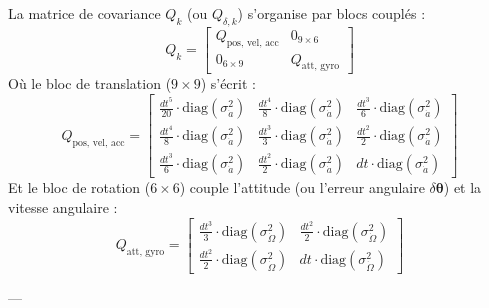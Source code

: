 \documentclass[../Formulations_Kalman.tex]{subfiles}
\begin{document}
La matrice de covariance $Q_k$ (ou $Q_{\delta, k}$) s'organise par blocs couplés :
\begin{equation}
Q_k = \begin{bmatrix}
Q_{\text{pos, vel, acc}} & 0_{9\times6} \\
0_{6\times9} & Q_{\text{att, gyro}}
\end{bmatrix}
\end{equation}
Où le bloc de translation ($9 \times 9$) s'écrit :
\begin{equation}
Q_{\text{pos, vel, acc}} = \begin{bmatrix}
\frac{dt^5}{20} \cdot \text{diag}(\sigma_{\dot{a}}^2) & \frac{dt^4}{8} \cdot \text{diag}(\sigma_{\dot{a}}^2) & \frac{dt^3}{6} \cdot \text{diag}(\sigma_{\dot{a}}^2) \\
\frac{dt^4}{8} \cdot \text{diag}(\sigma_{\dot{a}}^2) & \frac{dt^3}{3} \cdot \text{diag}(\sigma_{\dot{a}}^2) & \frac{dt^2}{2} \cdot \text{diag}(\sigma_{\dot{a}}^2) \\
\frac{dt^3}{6} \cdot \text{diag}(\sigma_{\dot{a}}^2) & \frac{dt^2}{2} \cdot \text{diag}(\sigma_{\dot{a}}^2) & dt \cdot \text{diag}(\sigma_{\dot{a}}^2)
\end{bmatrix}
\end{equation}
Et le bloc de rotation ($6 \times 6$) couple l'attitude (ou l'erreur angulaire $\delta\boldsymbol{\theta}$) et la vitesse angulaire :
\begin{equation}
Q_{\text{att, gyro}} = \begin{bmatrix}
\frac{dt^3}{3} \cdot \text{diag}(\sigma_{\dot{\Omega}}^2) & \frac{dt^2}{2} \cdot \text{diag}(\sigma_{\dot{\Omega}}^2) \\
\frac{dt^2}{2} \cdot \text{diag}(\sigma_{\dot{\Omega}}^2) & dt \cdot \text{diag}(\sigma_{\dot{\Omega}}^2)
\end{bmatrix}
\end{equation}

---
\end{document}

